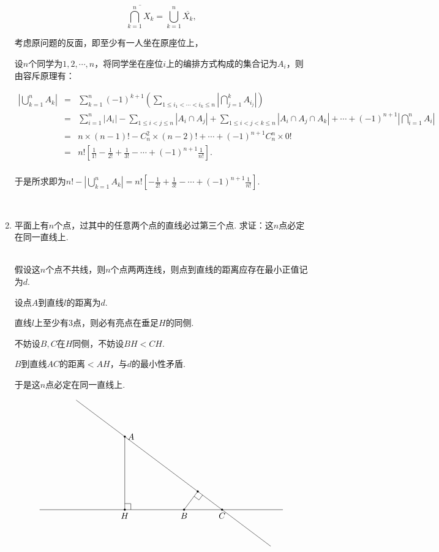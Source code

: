 \documentclass[8pt]{article}
\begin{document}
\begin{enumerate}
			$$\overline{\bigcap_{k=1}^n{X_k}}=\bigcup_{k=1}^n{\overline{X_k}},$$

			考虑原问题的反面，即至少有一人坐在原座位上，

			设$n$个同学为$1,2,\cdots,n$，将同学坐在座位$i$上的编排方式构成的集合记为$A_i$，则由容斥原理有：

			$$
				\begin{array}{rcl}
					\displaystyle{\left|\bigcup_{k=1}^nA_k\right|}&=&\displaystyle{\sum_{k=1}^n (-1)^{k+1}\left(\sum_{1\leq i_1<\cdots<i_k\leq n}\left|\bigcap_{j=1}^k A_{i_j}\right|\right)}\\
					&=&\displaystyle{\sum_{i=1}^n\left|A_i\right|-\sum_{1\leq i<j\leq n}\left|A_i\cap A_j\right|+\sum_{1\leq i<j<k\leq n}\left|A_i\cap A_j \cap A_k\right|+\cdots+\left(-1\right)^{n+1}\left|\bigcap_{i=1}^n A_i\right|}\\
					&=&n\times(n-1)!-C_n^2\times(n-2)!+\cdots+(-1)^{n+1}C_n^n\times0!\\
					&=&\displaystyle{n!\left[\frac{1}{1!}-\frac{1}{2!}+\frac{1}{3!}-\cdots+(-1)^{n+1}\frac{1}{n!}\right].}\\
				\end{array}
			$$

			于是所求即为$n!-\displaystyle{\left|\bigcup_{k=1}^nA_k\right|}=n!\left[-\frac{1}{2!}+\frac{1}{3!}-\cdots+(-1)^{n+1}\frac{1}{n!}\right].$

		~\\

		\item

			平面上有$n$个点，过其中的任意两个点的直线必过第三个点. 求证：这$n$点必定在同一直线上.

			~\\
			假设这$n$个点不共线，则$n$个点两两连线，则点到直线的距离应存在最小正值记为$d$.

			设点$A$到直线$l$的距离为$d$.

			直线$l$上至少有$3$点，则必有亮点在垂足$H$的同侧.

			不妨设$B, C$在$H$同侧，不妨设$BH<CH$.

			$B$到直线$AC$的距离$<AH$，与$d$的最小性矛盾.

			于是这$n$点必定在同一直线上.

			$$
			\begin{tikzpicture} [scale=0.5]
				\draw [black] (-10, 0)--(10, 0);
				\filldraw [black] (-3, 6) circle (2pt) node[anchor=west] {$A$};
				\draw [black] (-3, 6)--(-3, 0);
				\filldraw [black] (-3, 0) circle (2pt) node[anchor=north] {$H$};
				\draw [black] (-3, 0.5)--(-2.5, 0.5)--(-2.5, 0);
				\filldraw [black] (1.875, 0) circle (2pt) node[anchor=north] {$B$};
				\filldraw [black] (5, 0) circle (2pt) node[anchor=north] {$C$};
				\draw [black] (-7, 9)--(9, -3);
				\filldraw [black] (3, 1.5) circle (2pt);
				\draw [black] (3, 1.5)--(1.875, 0);
				\draw [black] (3.4, 1.2)--(3.1, 0.8)--(2.7, 1.1);

			\end{tikzpicture}
			$$

	\end{enumerate}
\end{document}
